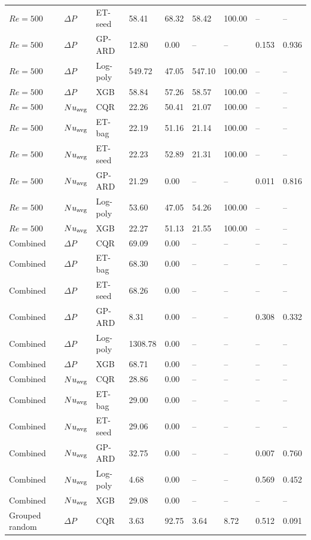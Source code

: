 \begin{longtable}{lllllllll}
$Re=500$ & $\Delta P$ & ET-seed & 58.41 & 68.32 & 58.42 & 100.00 & -- & --\\
$Re=500$ & $\Delta P$ & GP-ARD & 12.80 & 0.00 & -- & -- & 0.153 & 0.936\\
$Re=500$ & $\Delta P$ & Log-poly & 549.72 & 47.05 & 547.10 & 100.00 & -- & --\\
$Re=500$ & $\Delta P$ & XGB & 58.84 & 57.26 & 58.57 & 100.00 & -- & --\\
$Re=500$ & $Nu_{\rm avg}$ & CQR & 22.26 & 50.41 & 21.07 & 100.00 & -- & --\\
$Re=500$ & $Nu_{\rm avg}$ & ET-bag & 22.19 & 51.16 & 21.14 & 100.00 & -- & --\\
$Re=500$ & $Nu_{\rm avg}$ & ET-seed & 22.23 & 52.89 & 21.31 & 100.00 & -- & --\\
$Re=500$ & $Nu_{\rm avg}$ & GP-ARD & 21.29 & 0.00 & -- & -- & 0.011 & 0.816\\
$Re=500$ & $Nu_{\rm avg}$ & Log-poly & 53.60 & 47.05 & 54.26 & 100.00 & -- & --\\
$Re=500$ & $Nu_{\rm avg}$ & XGB & 22.27 & 51.13 & 21.55 & 100.00 & -- & --\\
Combined & $\Delta P$ & CQR & 69.09 & 0.00 & -- & -- & -- & --\\
Combined & $\Delta P$ & ET-bag & 68.30 & 0.00 & -- & -- & -- & --\\
Combined & $\Delta P$ & ET-seed & 68.26 & 0.00 & -- & -- & -- & --\\
Combined & $\Delta P$ & GP-ARD & 8.31 & 0.00 & -- & -- & 0.308 & 0.332\\
Combined & $\Delta P$ & Log-poly & 1308.78 & 0.00 & -- & -- & -- & --\\
Combined & $\Delta P$ & XGB & 68.71 & 0.00 & -- & -- & -- & --\\
Combined & $Nu_{\rm avg}$ & CQR & 28.86 & 0.00 & -- & -- & -- & --\\
Combined & $Nu_{\rm avg}$ & ET-bag & 29.00 & 0.00 & -- & -- & -- & --\\
Combined & $Nu_{\rm avg}$ & ET-seed & 29.06 & 0.00 & -- & -- & -- & --\\
Combined & $Nu_{\rm avg}$ & GP-ARD & 32.75 & 0.00 & -- & -- & 0.007 & 0.760\\
Combined & $Nu_{\rm avg}$ & Log-poly & 4.68 & 0.00 & -- & -- & 0.569 & 0.452\\
Combined & $Nu_{\rm avg}$ & XGB & 29.08 & 0.00 & -- & -- & -- & --\\
Grouped random & $\Delta P$ & CQR & 3.63 & 92.75 & 3.64 & 8.72 & 0.512 & 0.091\\

\end{longtable}
